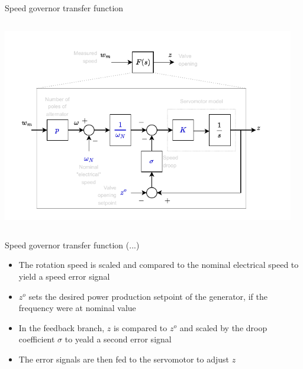 \begin{frame}{Speed governor transfer function}
    \begin{columns}
    \begin{column}{0.6\textwidth}
    \begin{center}
      \includegraphics[width=\textwidth]{images/speed_governor_transfer_function.pdf}    
    \end{center}
    \end{column}
    \begin{column}{0.35\textwidth}
      \color{blue}{Parameters are in blue.}
    \end{column}
    \end{columns}
\end{frame}

\begin{frame}{Speed governor transfer function (...)}
    \begin{itemize}
      \item The rotation speed is scaled and compared to the nominal electrical speed to yield a speed error signal
      \item $z^o$ sets the desired power production setpoint of the generator, if the frequency were at nominal value
      \item In the feedback branch, $z$ is compared to $z^o$ and scaled by the droop coefficient $\sigma$ to yeald a second error signal
      \item The error signals are then fed to the servomotor to adjust $z$        
    \end{itemize}
\end{frame}


